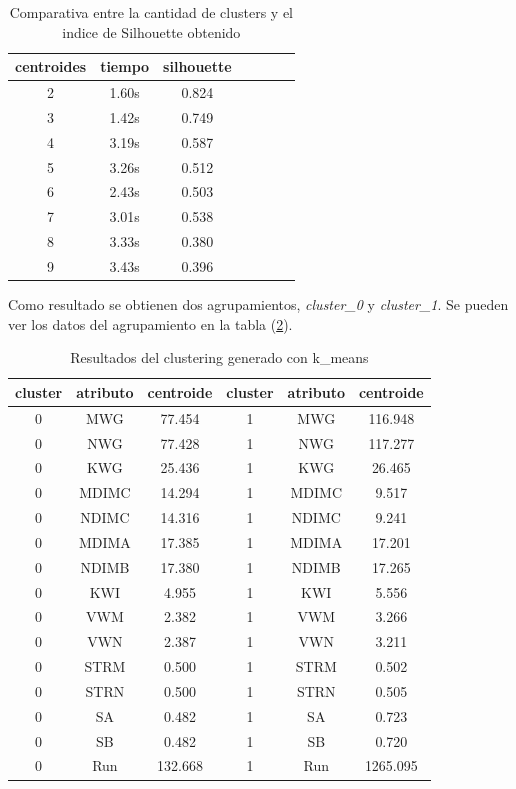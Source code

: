 \documentclass[osajnl,twocolumn,showpacs,superscriptaddress,10pt]{revtex4-1} %
\begin{document}
\begin{table}[h!]
    \centering
    \begin{tabular}{ccccccc}
        centroides & tiempo & silhouette \\
        \hline
        2 & 1.60s	& 0.824 \\
        3 & 1.42s	& 0.749 \\
        4 & 3.19s	& 0.587 \\
        5 & 3.26s	& 0.512 \\
        6 & 2.43s	& 0.503 \\
        7 & 3.01s	& 0.538 \\
        8 & 3.33s	& 0.380 \\
        9 & 3.43s	& 0.396 \\
        \hline
    \end{tabular}
    \caption{Comparativa entre la cantidad de clusters y el indice de Silhouette obtenido}
    \label{table:clusters_silhouette}
\end{table}

Como resultado se obtienen dos agrupamientos, \textit{cluster\_0} y \textit{cluster\_1}. Se pueden ver los datos del agrupamiento en la tabla (\ref{table:k_means}).

\begin{table}[h!]
    \centering
    \begin{tabular}{|ccc|ccc|}
        \hline
        cluster & atributo & centroide & cluster & atributo & centroide \\
        \hline
        0	& MWG & 77.454 & 1 &	MWG & 116.948 \\
        0	& NWG & 77.428 & 1 &	NWG & 117.277 \\
        0	& KWG & 25.436 & 1 &	KWG & 26.465 \\
        0	& MDIMC & 14.294 & 1 &	MDIMC & 9.517 \\
        0	& NDIMC & 14.316 & 1 &	NDIMC & 9.241 \\
        0	& MDIMA & 17.385 & 1 &	MDIMA & 17.201 \\
        0	& NDIMB & 17.380 & 1 &	NDIMB & 17.265 \\
        0	& KWI & 4.955 & 1 &	KWI & 5.556 \\
        0	& VWM & 2.382 & 1 &	VWM & 3.266 \\
        0	& VWN & 2.387 & 1 &	VWN & 3.211 \\
        0	& STRM & 0.500 & 1 &	STRM & 0.502 \\
        0	& STRN & 0.500 & 1 &	STRN & 0.505 \\
        0	& SA & 0.482 & 1 &	SA & 0.723 \\
        0	& SB & 0.482 & 1 &	SB & 0.720 \\
        0	& Run & 132.668 & 1 &	Run & 1265.095 \\
        \hline
    \end{tabular}
    \caption{Resultados del clustering generado con k\_means}
    \label{table:k_means}
\end{table}
\end{document}

